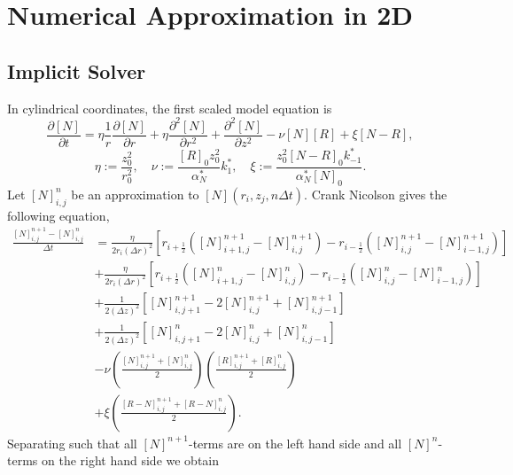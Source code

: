 \documentclass{article}
\begin{document}
\section{Numerical Approximation in 2D}

\subsection{Implicit Solver}
In cylindrical coordinates, the first scaled model equation is
\begin{equation*}
    \frac{\partial [N]}{\partial t} = 
    \eta \frac{1}{r} \frac{\partial [N]}{\partial r} + \eta  \frac{\partial^2 [N]}{\partial r^2}  +  \frac{\partial^2 [N]}{\partial z^2} -  \nu [N] [R] +  \xi [N-R],
\end{equation*}
\begin{equation*}
    \eta := \frac{z_0^2}{r_0^2}, \quad
    \nu := \frac{[R]_0 z_0^2}{\alpha_N^*} k_1^*, \quad
    \xi := \frac{ z_0^2 [N-R]_0 k_{-1}^*}{\alpha_N^* [N]_0}. 
\end{equation*}
Let $[N]_{i,j}^{n}$ be an approximation to $[N](r_i, z_j, n \Delta t)$. Crank Nicolson gives the following equation, 
\begin{align*}
    \frac{[N]_{i,j}^{n+1} - [N]_{i,j}^{n}}{\Delta t} &= \frac{\eta}{2 r_i (\Delta r)^2} \left[r_{i+\frac{1}{2}} \left( [N]_{i+1,j}^{n+1} - [N]_{i,j}^{n+1} \right) - r_{i-\frac{1}{2}} \left( [N]_{i,j}^{n+1} - [N]_{i-1,j}^{n+1} \right) \right] \\
    &+ \frac{\eta}{2 r_i (\Delta r)^2} \left[r_{i+\frac{1}{2}} \left( [N]_{i+1,j}^{n} - [N]_{i,j}^{n} \right) - r_{i-\frac{1}{2}} \left( [N]_{i,j}^{n} - [N]_{i-1,j}^{n} \right) \right] \\
    &+ \frac{1}{2 (\Delta z)^2} \left[ [N]_{i,j+1}^{n+1} - 2[N]_{i,j}^{n+1} + [N]_{i,j-1}^{n+1} \right] \\
    &+ \frac{1}{2 (\Delta z)^2} \left[ [N]_{i,j+1}^{n} - 2[N]_{i,j}^{n} + [N]_{i,j-1}^{n} \right] \\
    & - \nu \left( \frac{[N]_{i,j}^{n+1} + [N]_{i,j}^{n}}{2} \right)\left( \frac{[R]_{i,j}^{n+1} + [R]_{i,j}^{n}}{2} \right) \\
    &+ \xi \left( \frac{[R-N]_{i,j}^{n+1} + [R-N]_{i,j}^{n}}{2} \right).
\end{align*}
Separating such that all $[N]^{n+1}$-terms are on the left hand side and all $[N]^{n}$-terms on the right hand side we obtain
\end{document}
